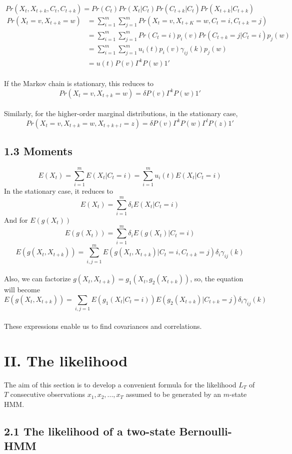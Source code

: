 \documentclass{article}
\begin{document}
$$Pr(X_t, X_{t+k}, C_t, C_{t+k}) = Pr(C_t) Pr(X_t|C_t) Pr(C_{t+k} | C_t) Pr(X_{t+k} | C_{t+k})$$
\begin{align}
    Pr(X_t = v, X_{t+k} = w) & = \sum_{i=1}^m \sum_{j=1}^m Pr(X_t = v, X_{t+K} = w, C_t = i, C_{t+k} = j) \\
    & = \sum_{i=1}^m \sum_{j=1}^m Pr(C_t = i) p_i(v) Pr(C_{t+k} = j | C_t = i) p_j(w) \\
    & = \sum_{i=1}^m \sum_{j=1}^m u_i(t) p_i(v) \gamma_{ij}(k) p_j(w) \\
    & = u(t) P(v) \Gamma^k P(w) 1'
\end{align}
\\
If the Markov chain is stationary, this reduces to
$$Pr(X_t = v, X_{t+k} = w) = \delta P(v) \Gamma^k P(w) 1'$$
\\
Similarly, for the higher-order marginal distributions, in the stationary case, 
$$Pr(X_t = v, X_{t+k} = w, X_{t+k+l} = z) = \delta P(v) \Gamma^k P(w) \Gamma^l P(z) 1'$$

\subsection*{1.3 Moments}
$$E(X_t) = \sum_{i=1}^m E(X_t | C_t = i) = \sum_{i=1}^m u_i(t) E(X_t | C_t = i)$$
In the stationary case, it reduces to 
$$E(X_t) = \sum_{i=1}^m \delta_i E(X_t | C_t = i)$$
And for $E(g(X_t))$
$$E(g(X_t)) = \sum_{i=1}^m \delta_i E(g(X_t) | C_t = i)$$
$$E(g(X_t, X_{t+k})) = \sum_{i, j = 1}^m E(g(X_t, X_{t+k}) | C_t = i, C_{t+k} = j) \delta_i \gamma_{ij}(k)$$
\\
Also, we can factorize $g(X_t, X_{t+k}) = g_1(X_t, g_2(X_{t+k}))$, so, the equation will become
$$E(g(X_t, X_{t+k})) = \sum_{i, j = 1} E(g_1(X_t | C_t = i)) E(g_2 (X_{t+k}) | C_{t+k} = j) \delta_i \gamma_{ij}(k)$$
\\
These expressions enable us to find covariances and correlations. 

\section*{II. The likelihood}
The aim of this section is to develop a convenient formula for the likelihood $L_T$ of $T$ consecutive observations $x_1, x_2, ..., x_T$ assumed to be generated by an $m$-state HMM.

\subsection*{2.1 The likelihood of a two-state Bernoulli-HMM}
\end{document}
